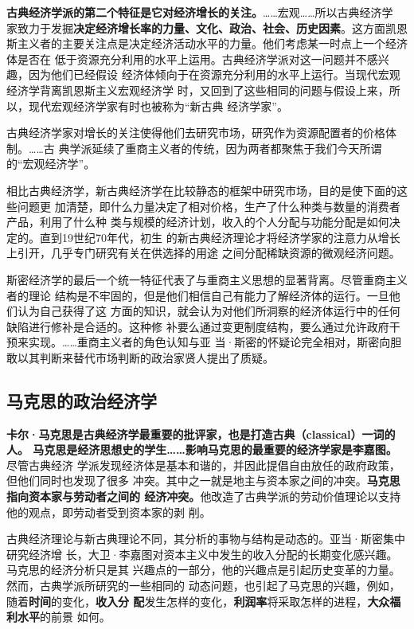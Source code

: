 \textbf{古典经济学派的第二个特征是它对经济增长的关注。}……宏观……所以古典经济学
家致力于发掘\textbf{决定经济增长率的力量、文化、政治、社会、历史因素}。这方面凯恩
斯主义者的主要关注点是决定经济活动水平的力量。他们考虑某一时点上一个经济体是否在
低于资源充分利用的水平上运用。古典经济学派对这一问题并不感兴趣，因为他们已经假设
经济体倾向于在资源充分利用的水平上运行。当现代宏观经济学背离凯恩斯主义宏观经济学
时，又回到了这些相同的问题与假设上来，所以，现代宏观经济学家有时也被称为“新古典
经济学家”。

古典经济学家对增长的关注使得他们去研究市场，研究作为资源配置者的价格体制。……古
典学派延续了重商主义者的传统，因为两者都聚焦于我们今天所谓的“宏观经济学”。

相比古典经济学，新古典经济学在比较静态的框架中研究市场，目的是使下面的这些问题更
加清楚，即什么力量决定了相对价格，生产了什么种类与数量的消费者产品，利用了什么种
类与规模的经济计划，收入的个人分配与功能分配是如何决定的。直到19世纪70年代，初生
的新古典经济理论才将经济学家的注意力从增长上引开，几乎专门研究有关在供选择的用途
之间分配稀缺资源的微观经济问题。

斯密经济学的最后一个统一特征代表了与重商主义思想的显著背离。尽管重商主义者的理论
结构是不牢固的，但是他们相信自己有能力了解经济体的运行。一旦他们认为自己获得了这
方面的知识，就会认为对他们所洞察的经济体运行中的任何缺陷进行修补是合适的。这种修
补要么通过变更制度结构，要么通过允许政府干预来实现。……重商主义者的角色认知与亚
当·斯密的怀疑论完全相对，斯密向胆敢以其判断来替代市场判断的政治家贤人提出了质疑。

\subsection*{马克思的政治经济学}

\textbf{卡尔·马克思是古典经济学最重要的批评家，也是打造古典（classical）一词的人。
  马克思是经济思想史的学生……影响马克思的最重要的经济学家是李嘉图。}尽管古典经济
学派发现经济体是基本和谐的，并因此提倡自由放任的政府政策，但他们同时也发现了很多
冲突。其中之一就是地主与资本家之间的冲突。\textbf{马克思指向资本家与劳动者之间的
  经济冲突。}他改造了古典学派的劳动价值理论以支持他的观点，即劳动者受到资本家的剥
削。

古典经济理论与新古典理论不同，其分析的事物与结构是动态的。亚当·斯密集中研究经济增
长，大卫·李嘉图对资本主义中发生的收入分配的长期变化感兴趣。马克思的经济分析只是其
兴趣点的一部分，他的兴趣点是引起历史变革的力量。然而，古典学派所研究的一些相同的
动态问题，也引起了马克思的兴趣，例如，随着\textbf{时间}的变化，\textbf{收入分
  配}发生怎样的变化，\textbf{利润率}将采取怎样的进程，\textbf{大众福利水平}的前景
如何。

